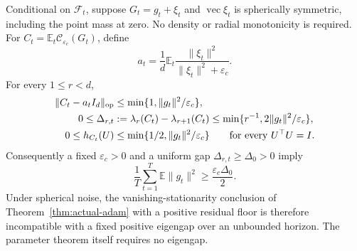 \begin{theorem}
\label{thm:gap-collapse}
Conditional on $\mathcal F_t$, suppose $G_t=g_t+\xi_t$ and
$\operatorname{vec}\xi_t$ is spherically symmetric, including the point mass
at zero. No density or radial monotonicity is required. For
$C_t=\mathbb E_t\mathcal C_{\varepsilon_c}(G_t)$, define
\begin{equation}
 a_t=\frac1d\mathbb E_t\frac{\|\xi_t\|^2}{\|\xi_t\|^2+\varepsilon_c}.
\end{equation}
For every $1\le r<d$,
\begin{align}
 \|C_t-a_tI_d\|_{\rm op}&\le\min\{1,\|g_t\|^2/\varepsilon_c\},\label{eq:covariance-isotropy-limit}\\
 0\le\Delta_{r,t}&:=\lambda_r(C_t)-\lambda_{r+1}(C_t)
                     \le\min\{r^{-1},2\|g_t\|^2/\varepsilon_c\},\label{eq:gap-collapse}\\
 0\le h_{C_t}(U)&\le\min\{1/2,\|g_t\|^2/\varepsilon_c\}
                 \qquad\text{for every }U^\top U=I.\label{eq:energy-without-angle}
\end{align}
Consequently a fixed $\varepsilon_c>0$ and a uniform gap
$\Delta_{r,t}\ge\Delta_0>0$ imply
\begin{equation}
 \frac1T\sum_{t=1}^T\mathbb E\|g_t\|^2
                         \ge\frac{\varepsilon_c\Delta_0}{2}.
 \label{eq:gap-stationarity-incompatibility}
\end{equation}
Under spherical noise, the vanishing-stationarity conclusion of
Theorem~\ref{thm:actual-adam} with a positive residual floor is therefore
incompatible with a fixed positive eigengap over an unbounded horizon.
The parameter theorem itself requires no eigengap.
\end{theorem}
